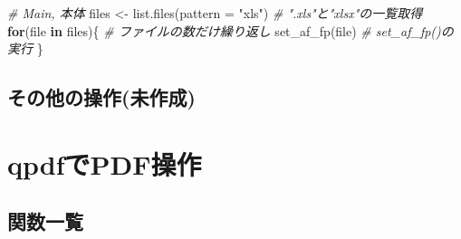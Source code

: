\documentclass[
]{article}
\newenvironment{Shaded}{\begin{snugshade}}{\end{snugshade}}
\newcommand{\AttributeTok}[1]{\textcolor[rgb]{0.77,0.63,0.00}{#1}}
\newcommand{\CommentTok}[1]{\textcolor[rgb]{0.56,0.35,0.01}{\textit{#1}}}
\newcommand{\ControlFlowTok}[1]{\textcolor[rgb]{0.13,0.29,0.53}{\textbf{#1}}}
\newcommand{\FunctionTok}[1]{\textcolor[rgb]{0.00,0.00,0.00}{#1}}
\newcommand{\NormalTok}[1]{#1}
\newcommand{\OtherTok}[1]{\textcolor[rgb]{0.56,0.35,0.01}{#1}}
\newcommand{\StringTok}[1]{\textcolor[rgb]{0.31,0.60,0.02}{#1}}
\begin{document}
\begin{Shaded}
\begin{Highlighting}[]
  \CommentTok{\# Main, 本体}
\NormalTok{files }\OtherTok{\textless{}{-}} \FunctionTok{list.files}\NormalTok{(}\AttributeTok{pattern =} \StringTok{"xls"}\NormalTok{) }\CommentTok{\# ".xls"と"xlsx"の一覧取得}
\ControlFlowTok{for}\NormalTok{(file }\ControlFlowTok{in}\NormalTok{ files)\{                  }\CommentTok{\# ファイルの数だけ繰り返し}
  \FunctionTok{set\_af\_fp}\NormalTok{(file)                    }\CommentTok{\# set\_af\_fp()の実行}
\NormalTok{\}}
\end{Highlighting}
\end{Shaded}

\hypertarget{ux305dux306eux4ed6ux306eux64cdux4f5cux672aux4f5cux6210}{%
\subsection{その他の操作(未作成)}\label{ux305dux306eux4ed6ux306eux64cdux4f5cux672aux4f5cux6210}}

\hypertarget{qpdf}{%
\section{qpdfでPDF操作}\label{qpdf}}

\hypertarget{ux95a2ux6570ux4e00ux89a7}{%
\subsection{関数一覧}\label{ux95a2ux6570ux4e00ux89a7}}
\end{document}

